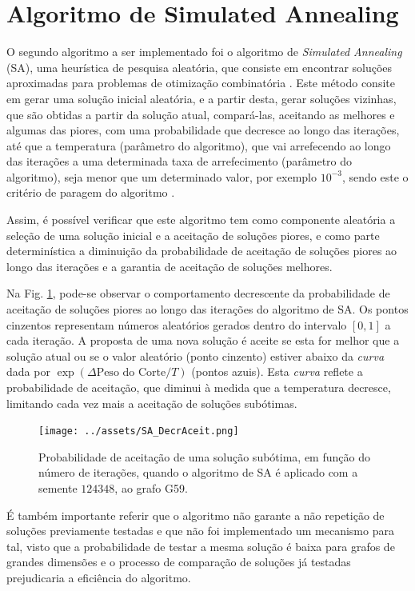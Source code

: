 \documentclass[mirror, portugues]{revdetua}
\begin{document}
\section{Algoritmo de Simulated Annealing}

O segundo algoritmo a ser implementado foi o algoritmo de \textit{Simulated Annealing} (SA), uma heurística de pesquisa aleatória, que consiste em encontrar soluções aproximadas para problemas de otimização combinatória \cite{SAT15}. Este método consite em gerar uma solução inicial aleatória, e a partir desta, gerar soluções vizinhas, que são obtidas a partir da solução atual, compará-las, aceitando as melhores e algumas das piores, com uma probabilidade que decresce ao longo das iterações, até que a temperatura (parâmetro do algoritmo), que vai arrefecendo ao longo das iterações a uma determinada taxa de arrefecimento (parâmetro do algoritmo), seja menor que um determinado valor, por exemplo $10^{-3}$, sendo este o critério de paragem do algoritmo \cite{SA87}.

Assim, é possível verificar que este algoritmo tem como componente aleatória a seleção de uma solução inicial e a aceitação de soluções piores, e como parte determinística a diminuição da probabilidade de aceitação de soluções piores ao longo das iterações e a garantia de aceitação de soluções melhores.

Na Fig. \ref{fig:sa_aceitacao}, pode-se observar o comportamento decrescente da probabilidade de aceitação de soluções piores ao longo das iterações do algoritmo de SA. Os pontos cinzentos representam números aleatórios gerados dentro do intervalo $[0,1]$ a cada iteração. A proposta de uma nova solução é aceite se esta for melhor que a solução atual ou se o valor aleatório (ponto cinzento) estiver abaixo da \textit{curva} dada por $\exp(\Delta \text{Peso do Corte}/T)$ (pontos azuis). Esta \textit{curva} reflete a probabilidade de aceitação, que diminui à medida que a temperatura decresce, limitando cada vez mais a aceitação de soluções subótimas.

\begin{figure}[H]
    \centering
    \texttt{[image: ../assets/SA\_DecrAceit.png]}
    \caption{Probabilidade de aceitação de uma solução subótima, em função do número de iterações, quando o algoritmo de SA é aplicado com a semente $124348$, ao grafo G59.}
    \label{fig:sa_aceitacao}
\end{figure}

É também importante referir que o algoritmo não garante a não repetição de soluções previamente testadas e que não foi implementado um mecanismo para tal, visto que a probabilidade de testar a mesma solução é baixa para grafos de grandes dimensões e o processo de comparação de soluções já testadas prejudicaria a eficiência do algoritmo.
\end{document}
